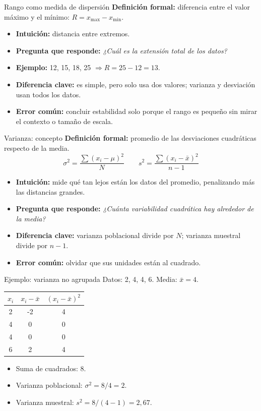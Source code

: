 \documentclass[aspectratio=169,11pt]{beamer}
\newcommand{\pregunta}[1]{\textbf{Pregunta que responde:} \emph{#1}}
\newcommand{\errorcomun}[1]{\textbf{Error común:} #1}
\newcommand{\diferencia}[1]{\textbf{Diferencia clave:} #1}
\begin{document}
\begin{frame}{Rango como medida de dispersión}
\textbf{Definición formal:} diferencia entre el valor máximo y el mínimo: $R=x_{\max}-x_{\min}$.
\begin{itemize}
  \item \textbf{Intuición:} distancia entre extremos.
  \item \pregunta{¿Cuál es la extensión total de los datos?}
  \item \textbf{Ejemplo:} 12, 15, 18, 25 $\Rightarrow R=25-12=13$.
  \item \diferencia{es simple, pero solo usa dos valores; varianza y desviación usan todos los datos.}
  \item \errorcomun{concluir estabilidad solo porque el rango es pequeño sin mirar el contexto o tamaño de escala.}
\end{itemize}
\end{frame}

\begin{frame}{Varianza: concepto}
\textbf{Definición formal:} promedio de las desviaciones cuadráticas respecto de la media.
\[
\sigma^2=\frac{\sum (x_i-\mu)^2}{N}\qquad s^2=\frac{\sum (x_i-\bar{x})^2}{n-1}
\]
\begin{itemize}
  \item \textbf{Intuición:} mide qué tan lejos están los datos del promedio, penalizando más las distancias grandes.
  \item \pregunta{¿Cuánta variabilidad cuadrática hay alrededor de la media?}
  \item \diferencia{varianza poblacional divide por $N$; varianza muestral divide por $n-1$.}
  \item \errorcomun{olvidar que sus unidades están al cuadrado.}
\end{itemize}
\end{frame}

\begin{frame}{Ejemplo: varianza no agrupada}
Datos: 2, 4, 4, 6. Media: $\bar{x}=4$.
\begin{center}
\begin{tabular}{ccc}
\toprule
$x_i$ & $x_i-\bar{x}$ & $(x_i-\bar{x})^2$ \\
\midrule
2 & -2 & 4 \\
4 & 0 & 0 \\
4 & 0 & 0 \\
6 & 2 & 4 \\
\bottomrule
\end{tabular}
\end{center}
\begin{itemize}
  \item Suma de cuadrados: 8.
  \item Varianza poblacional: $\sigma^2=8/4=2$.
  \item Varianza muestral: $s^2=8/(4-1)=2{,}67$.
\end{itemize}
\end{frame}
\end{document}
